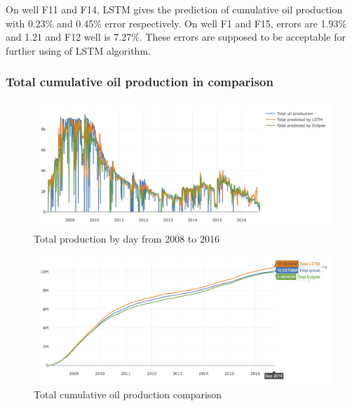 \documentclass[12pt,a4paper]{report}
\begin{document}
On well F11 and F14, LSTM gives the prediction of cumulative oil production with 0.23\% and 0.45\% error respectively. On well F1 and F15, errors are 1.93\% and 1.21 and F12 well is 7.27\%. These errors are supposed to be acceptable for further using of LSTM algorithm.


\subsubsection{Total cumulative oil production in comparison}
\begin{figure}[H]
  \centering
  \includegraphics[width=\linewidth]{Cumulative/SS1}
  \caption{Total production by day from 2008 to 2016}
\end{figure}

\begin{figure}[H]
  \centering
  \includegraphics[width=\linewidth]{Cumulative/SS}
  \caption{Total cumulative oil production comparison}
\end{figure}
\end{document}

